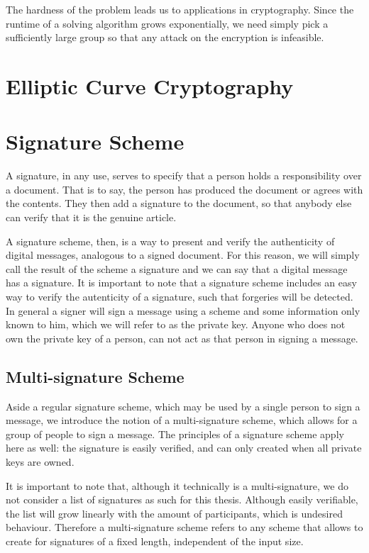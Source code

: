 \documentclass[12pt]{report}
\theoremstyle{plain}
\theoremstyle{definition}
\begin{document}
	The hardness of the problem leads us to applications in cryptography. Since the runtime of a solving algorithm grows exponentially, we need simply pick a sufficiently large group so that any attack on the encryption is infeasible.
	\section{Elliptic Curve Cryptography}
	
	\section{Signature Scheme}
	A signature, in any use, serves to specify that a person holds a responsibility over a document. That is to say, the person has produced the document or agrees with the contents. They then add a signature to the document, so that anybody else can verify that it is the genuine article.
	
	A signature scheme, then, is a way to present and verify the authenticity of digital messages, analogous to a signed document. For this reason, we will simply call the result of the scheme a signature and we can say that a digital message has a signature. It is important to note that a signature scheme includes an easy way to verify the autenticity of a signature, such that forgeries will be detected. In general a signer will sign a message using a scheme and some information only known to him, which we will refer to as the private key. Anyone who does not own the private key of a person, can not act as that person in signing a message.
	\subsection{Multi-signature Scheme}
	Aside a regular signature scheme, which may be used by a single person to sign a message, we introduce the notion of a multi-signature scheme, which allows for a group of people to sign a message. The principles of a signature scheme apply here as well: the signature is easily verified, and can only created when all private keys are owned.
	
	It is important to note that, although it technically is a multi-signature, we do not consider a list of signatures as such for this thesis. Although easily verifiable, the list will grow linearly with the amount of participants, which is undesired behaviour. Therefore a multi-signature scheme refers to any scheme that allows to create for signatures of a fixed length, independent of the input size.
\end{document}
